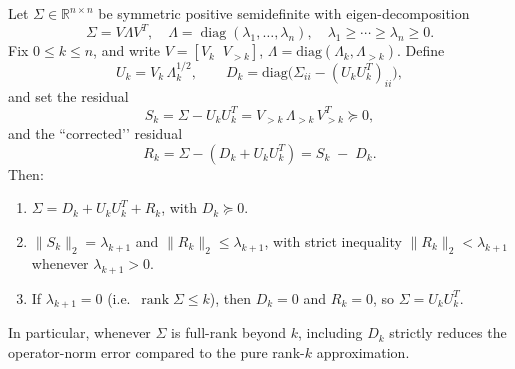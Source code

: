 \documentclass[final,hidelinks,onefignum,onetabnum]{siamart250211}
\providecommand{\R}{\mathbb{R}}
\providecommand{\diag}{\mathrm{diag}}
\providecommand{\1}{\mathbf{1}}
\theoremstyle{plain}
\DeclareMathOperator{\rank}{rank}
\begin{document}
\begin{proposition} \label{prop:naivedecomposition}
Let \(\Sigma\in\R^{n\times n}\) be symmetric positive semidefinite with eigen-decomposition
\[
  \Sigma = V\Lambda V^T,\quad
  \Lambda=\operatorname{diag}(\lambda_1,\dots,\lambda_n),\quad
  \lambda_1\ge\cdots\ge\lambda_n\ge0.
\]
Fix \(0\le k\le n\), and write \(V=[V_k\;\;V_{>k}]\), \(\Lambda=\mathrm{diag}(\Lambda_k,\Lambda_{>k})\).  Define
\[
  U_k = V_k\,\Lambda_k^{1/2}, 
  \qquad
  D_k = \diag\!\bigl(\Sigma_{ii}-(U_kU_k^T)_{ii}\bigr),
\]
and set the residual
\[
  S_k = \Sigma - U_kU_k^T
  = V_{>k}\,\Lambda_{>k}\,V_{>k}^T \succeq 0,
\]
and the “corrected’’ residual
\[
  R_k = \Sigma - (D_k + U_kU_k^T)
  = S_k \;-\;D_k.
\]
Then:
\begin{enumerate}
  \item \(\Sigma = D_k + U_kU_k^T + R_k\), with \(D_k\succeq0\).
  \item \(\|S_k\|_2 = \lambda_{k+1}\) and
  \(\|R_k\|_2 \le \lambda_{k+1}\), with strict inequality
  \(\|R_k\|_2<\lambda_{k+1}\) whenever \(\lambda_{k+1}>0\).  
  \item If \(\lambda_{k+1}=0\) (i.e.\ \(\rank\Sigma\le k\)), then \(D_k=0\) and \(R_k=0\), so \(\Sigma=U_kU_k^T\).
\end{enumerate}
In particular, whenever \(\Sigma\) is full-rank beyond \(k\), including \(D_k\) strictly reduces the operator-norm error compared to the pure rank-\(k\) approximation.
\end{proposition}
\end{document}
